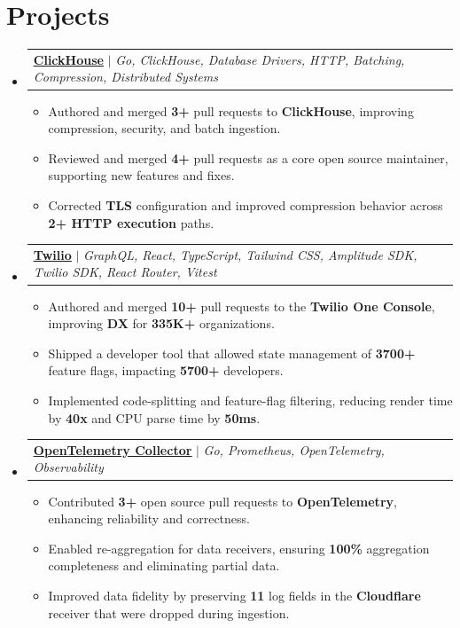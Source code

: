 \documentclass[letterpaper,11pt]{article}
\makeatletter
\newcommand{\resumeItem}[1]{
  \item\small{
    {#1 \vspace{-2pt}}
  }
}
\newcommand{\resumeProjectHeading}[2]{
    \item
    \begin{tabular*}{0.97\textwidth}{l@{\extracolsep{\fill}}r}
      \small#1\\
    \end{tabular*}\vspace{-7pt}
}
\newcommand{\resumeSubHeadingListStart}{\begin{itemize}[leftmargin=0.15in, label={}]}
\newcommand{\resumeSubHeadingListEnd}{\end{itemize}}
\newcommand{\resumeItemListStart}{\begin{itemize}}
\newcommand{\resumeItemListEnd}{\end{itemize}\vspace{-7pt}}
\makeatother
\begin{document}
\section{Projects}
    \resumeSubHeadingListStart
      \resumeProjectHeading
        {\textbf{\href{https://github.com/ClickHouse/clickhouse-go}{\ul{ClickHouse}}} $|$ \emph{Go, ClickHouse, Database Drivers, HTTP, Batching, Compression, Distributed Systems}}{June 2021 -- Present}
          \resumeItemListStart
            \resumeItem{Authored and merged \textbf{3+} pull requests to \textbf{ClickHouse}, improving compression, security, and batch ingestion.}
            \resumeItem{Reviewed and merged \textbf{4+} pull requests as a core open source maintainer, supporting new features and fixes.}
            \resumeItem{Corrected \textbf{TLS} configuration and improved compression behavior across \textbf{2+ HTTP execution} paths.}
          \resumeItemListEnd
        \resumeProjectHeading
        {\textbf{\href{https://www.twilio.com/en-us}{\ul{Twilio}}} $|$ \emph{GraphQL, React, TypeScript, Tailwind CSS, Amplitude SDK, Twilio SDK, React Router, Vitest}}{June 2021 -- Present}
            \resumeItemListStart
            \resumeItem{Authored and merged \textbf{10+} pull requests to the \textbf{Twilio One Console}, improving \textbf{DX} for \textbf{335K+} organizations.}
            \resumeItem{Shipped a developer tool that allowed state management of \textbf{3700+} feature flags, impacting \textbf{5700+} developers.}
            \resumeItem{Implemented code-splitting and feature-flag filtering, reducing render time by \textbf{40x} and CPU parse time by \textbf{50ms}.}
        \resumeItemListEnd
      \resumeProjectHeading
        {\textbf{\href{https://github.com/open-telemetry/opentelemetry-collector-contrib}{\underline{OpenTelemetry Collector}}} $|$ \emph{Go, Prometheus, OpenTelemetry, Observability}}{June 2021 -- Present}
          \resumeItemListStart
            \resumeItem{Contributed \textbf{3+} open source pull requests to \textbf{OpenTelemetry}, enhancing reliability and correctness.}
            \resumeItem{Enabled re-aggregation for data receivers, ensuring \textbf{100\%} aggregation completeness and eliminating partial data.}
            \resumeItem{Improved data fidelity by preserving \textbf{11} log fields in the \textbf{Cloudflare} receiver that were dropped during ingestion.}
          \resumeItemListEnd
    \resumeSubHeadingListEnd
%
\end{document}
